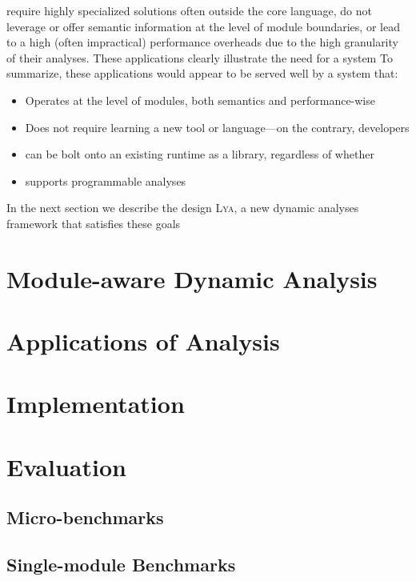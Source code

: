 \documentclass[letterpaper,twocolumn,10pt]{article}
\newcommand{\sys}{{\scshape Lya}\xspace}
\begin{document}
require highly specialized solutions often outside the core language,
do not leverage or offer semantic information at the level of module boundaries,
or lead to a high (often impractical) performance overheads due to the high granularity of their analyses.
These applications clearly illustrate the need for a system 
To summarize, these applications would appear to be served well by a system that:
\begin{itemize}
  \item Operates at the level of modules, both semantics and performance-wise
  \item Does not require learning a new tool or language---on the contrary,
    developers
  \item can be bolt onto an existing runtime as a library, regardless of whether 
  \item supports programmable analyses
\end{itemize}

In the next section we describe the design \sys, a new dynamic analyses
framework that satisfies these goals

\section{Module-aware Dynamic Analysis}
\label{design}


\section{Applications of Analysis}
\label{apps}

\section{Implementation}
\label{impl}

\section{Evaluation}
\label{eval}

\subsection{Micro-benchmarks}
\label{micro}

\subsection{Single-module Benchmarks}
\label{meso}
\end{document}
